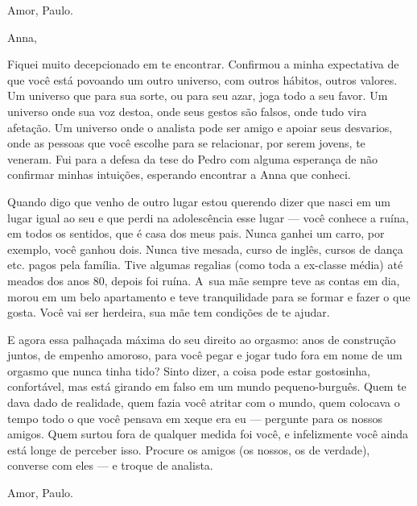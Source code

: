 \medskip{}  \begin{flushright}Amor, Paulo.\end{flushright}


\asterisc{}

Anna,

\medskip{} 

Fiquei muito decepcionado em te encontrar. Confirmou a minha expectativa
de que você está povoando um outro universo, com outros hábitos, outros
valores. Um universo que para sua sorte, ou para seu azar, joga todo a
seu favor. Um universo onde sua voz destoa, onde seus gestos são falsos,
onde tudo vira afetação. Um universo onde o analista pode ser amigo e
apoiar seus desvarios, onde as pessoas que você escolhe para se
relacionar, por serem jovens, te veneram. Fui para a defesa da tese do
Pedro com alguma esperança de não confirmar minhas intuições, esperando
encontrar a Anna que conheci.

Quando digo que venho de outro lugar estou querendo dizer que nasci em
um lugar igual ao seu e que perdi na adolescência esse lugar --- você
conhece a ruína, em todos os sentidos, que é casa dos meus pais. Nunca
ganhei um carro, por exemplo, você ganhou dois. Nunca tive mesada, curso
de inglês, cursos de dança etc. pagos pela família. Tive algumas
regalias (como toda a ex-classe média) até meados dos anos 80, depois
foi ruína. A~sua mãe sempre teve as contas em dia, morou em um belo
apartamento e teve tranquilidade para se formar e fazer o que gosta.
Você vai ser herdeira, sua mãe tem condições de te ajudar.

E agora essa palhaçada máxima do seu direito ao orgasmo: anos de
construção juntos, de empenho amoroso, para você pegar e jogar tudo fora
em nome de um orgasmo que nunca tinha tido? Sinto dizer, a coisa pode
estar gostosinha, confortável, mas está girando em falso em um mundo
pequeno-burguês. Quem te dava dado de realidade, quem fazia você atritar
com o mundo, quem colocava o tempo todo o que você pensava em xeque era
eu --- pergunte para os nossos amigos. Quem surtou fora de qualquer
medida foi você, e infelizmente você ainda está longe de perceber isso.
Procure os amigos (os nossos, os de verdade), converse com eles --- e
troque de analista.

\medskip{}  \begin{flushright}Amor, Paulo.\end{flushright}


\asterisc{}

\pagebreak{}

